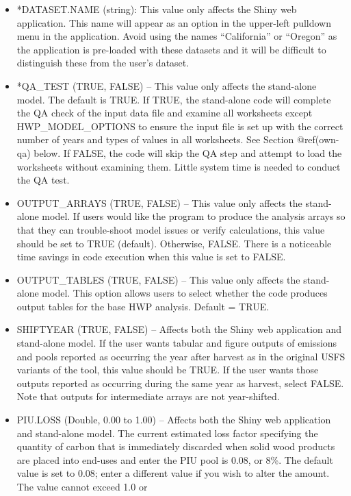 \documentclass[
  openany]{book}
\begin{document}
\begin{itemize}
\item
  *DATASET.NAME (string): This value only affects the Shiny web
  application. This name will appear as an option in the upper-left
  pulldown menu in the application. Avoid using the names ``California''
  or ``Oregon'' as the application is pre-loaded with these datasets and
  it will be difficult to distinguish these from the user's dataset.
\item
  *QA\_TEST (TRUE, FALSE) -- This value only affects the stand-alone
  model. The default is TRUE. If TRUE, the stand-alone code will
  complete the QA check of the input data file and examine all
  worksheets except HWP\_MODEL\_OPTIONS to ensure the input file is set
  up with the correct number of years and types of values in all
  worksheets. See Section @ref(own-qa) below. If FALSE, the code will
  skip the QA step and attempt to load the worksheets without examining
  them. Little system time is needed to conduct the QA test.
\item
  OUTPUT\_ARRAYS (TRUE, FALSE) -- This value only affects the
  stand-alone model. If users would like the program to produce the
  analysis arrays so that they can trouble-shoot model issues or verify
  calculations, this value should be set to TRUE (default). Otherwise,
  FALSE. There is a noticeable time savings in code execution when this
  value is set to FALSE.
\item
  OUTPUT\_TABLES (TRUE, FALSE) -- This value only affects the
  stand-alone model. This option allows users to select whether the code
  produces output tables for the base HWP analysis. Default = TRUE.
\item
  SHIFTYEAR (TRUE, FALSE) -- Affects both the Shiny web application and
  stand-alone model. If the user wants tabular and figure outputs of
  emissions and pools reported as occurring the year after harvest as in
  the original USFS variants of the tool, this value should be TRUE. If
  the user wants those outputs reported as occurring during the same
  year as harvest, select FALSE. Note that outputs for intermediate
  arrays are not year-shifted.
\item
  PIU.LOSS (Double, 0.00 to 1.00) -- Affects both the Shiny web
  application and stand-alone model. The current estimated loss factor
  specifying the quantity of carbon that is immediately discarded when
  solid wood products are placed into end-uses and enter the PIU pool is
  0.08, or 8\%. The default value is set to 0.08; enter a different
  value if you wish to alter the amount. The value cannot exceed 1.0 or

\end{itemize}
\end{document}
